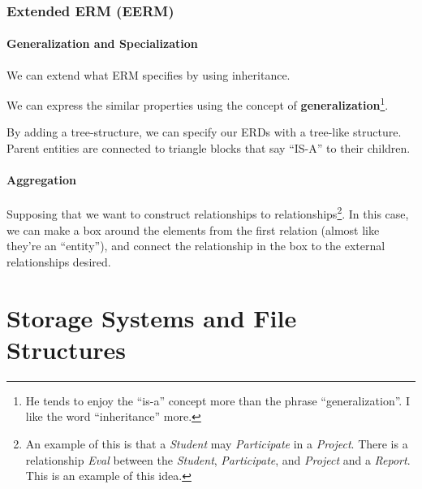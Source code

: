                 \subsection{Extended ERM (EERM)} %
                \label{sub:extended_erm}
                    \subsubsection{Generalization and Specialization} %
                    \label{ssub:generalization_and_specialization}

                        We can extend what ERM specifies by using inheritance.

                        We can express the similar properties using the concept of \textbf{generalization}\footnote{He tends to enjoy the ``is-a'' concept more than the phrase ``generalization''.
                        I like the word ``inheritance'' more.}.

                        By adding a tree-structure, we can specify our ERDs with a tree-like structure.
                        Parent entities are connected to triangle blocks that say ``IS-A'' to their children.
                    \subsubsection{Aggregation} %
                    \label{ssub:aggregation}
                        Supposing that we want to construct relationships to relationships\footnote{An example of this is that a \textit{Student} may \textit{Participate} in a \textit{Project}.
                        There is a relationship \textit{Eval} between the \textit{Student}, \textit{Participate}, and \textit{Project} and a \textit{Report}.
                        This is an example of this idea.}.
                        In this case, we can make a box around the elements from the first relation (almost like they're an ``entity''), and connect the relationship in the box to the external relationships desired.
        \chapter{Storage Systems and File Structures} %
        \label{cha:storage_systems_and_file_structures}
